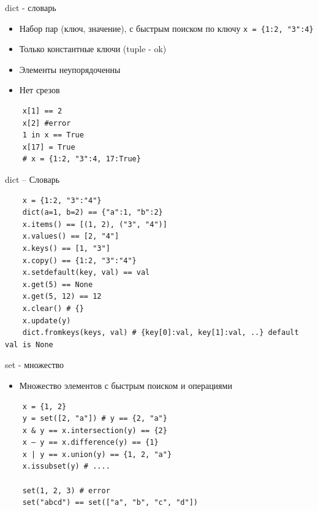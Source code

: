 \documentclass{article}
\begin{document}
\begin{center} dict - словарь \end{center}
\begin{itemize}
	\item Набор пар (ключ, значение), с быстрым поиском по ключу
	\lstinline$x = {1:2, "3":4}$
	\item Только константные ключи (tuple - ok)
	\item Элементы неупорядоченны
	\item Нет срезов
\end{itemize}
\vspace{15pt}
\begin{lstlisting}
	x[1] == 2
	x[2] #error
	1 in x == True
	x[17] = True
	# x = {1:2, "3":4, 17:True}
\end{lstlisting}
\newpage

\begin{center} dict – Словарь \end{center}
\vspace{15pt}
\begin{lstlisting}
	x = {1:2, "3":"4"}
	dict(a=1, b=2) == {"a":1, "b":2}
	x.items() == [(1, 2), ("3", "4")]
	x.values() == [2, "4"]
	x.keys() == [1, "3"]
	x.copy() == {1:2, "3":"4"}
	x.setdefault(key, val) == val
	x.get(5) == None
	x.get(5, 12) == 12
	x.clear() # {}
	x.update(y)
	dict.fromkeys(keys, val) # {key[0]:val, key[1]:val, ..} default val is None
\end{lstlisting}
\newpage

\begin{center} set - множество \end{center}
\begin{itemize}
	\item Множество элементов с быстрым поиском и операциями
\end{itemize}
\vspace{15pt}
\begin{lstlisting}
	x = {1, 2} 
	y = set([2, "a"]) # y == {2, "a"}
	x & y == x.intersection(y) == {2}
	x – y == x.difference(y) == {1}
	x | y == x.union(y) == {1, 2, "a"}
	x.issubset(y) # ....

	set(1, 2, 3) # error
	set("abcd") == set(["a", "b", "c", "d"])
\end{lstlisting}
\newpage
\end{document}
